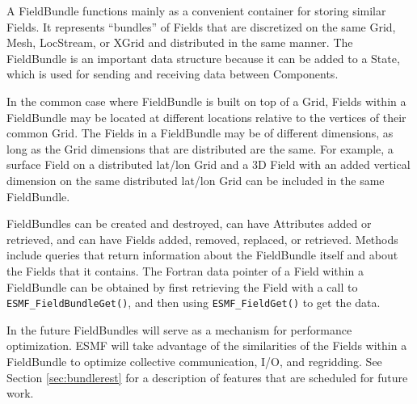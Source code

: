 
A FieldBundle functions mainly as a convenient container for storing
similar Fields.  It represents ``bundles'' of Fields that are 
discretized on the same Grid, Mesh, LocStream, or XGrid and distributed in the same manner.
The FieldBundle is an important data structure because it can be added to a State, 
which is used for sending and receiving data between Components.

In the common case where FieldBundle is built on top of a Grid,
Fields within a FieldBundle may be located at different locations relative 
to the vertices of their common Grid.  The Fields in a FieldBundle may
be of different dimensions, as long as the Grid dimensions that 
are distributed are the same.  For example, a surface Field on 
a distributed lat/lon Grid and a 3D Field with an added vertical 
dimension on the same distributed lat/lon Grid can be included
in the same FieldBundle.
 
FieldBundles can be created and destroyed, can have Attributes 
added or retrieved, and can have Fields added, removed, replaced, or retrieved.
Methods include queries that return information about the FieldBundle
itself and about the Fields that it contains.  The Fortran 
data pointer of a Field within a FieldBundle can be obtained 
by first retrieving the Field with a call to {\tt ESMF\_FieldBundleGet()},
and then using {\tt ESMF\_FieldGet()} to get the data.

In the future FieldBundles will serve as a mechanism for performance
optimization.  ESMF will take advantage of the similarities of the
Fields within a FieldBundle to optimize collective communication,
I/O, and regridding.  See Section \ref{sec:bundlerest} for a
description of features that are scheduled for future work.
